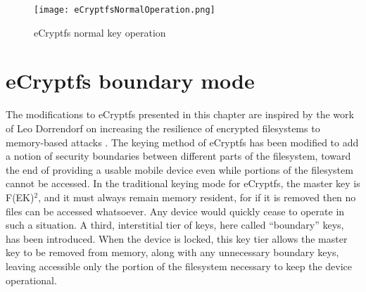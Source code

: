 \begin{figure}[htb]
\begin{center}
\texttt{[image: eCryptfsNormalOperation.png]} \end{center}
\caption{eCryptfs normal key operation} \label{fig:ecryptfsnormal} \end{figure}

\section{eCryptfs boundary mode}
\label{sec:boundarymode}
The modifications to eCryptfs presented in this chapter are inspired by the work of Leo Dorrendorf on increasing the resilience of
encrypted filesystems to memory-based attacks \cite{Dorrendorf2011}. The keying method of eCryptfs has been modified to add a
notion of security boundaries between different parts of the filesystem, toward the end of providing a usable mobile device even
while portions of the filesystem cannot be accessed. In the traditional keying mode for eCryptfs, the master key is
F(EK)$^{2}$, and it must always remain memory resident, for if it is removed then no files can be accessed whatsoever.
Any device would quickly cease to operate in such a situation. A third, interstitial tier of keys, here called ``boundary'' keys, has
been introduced. When the device is locked, this key tier allows the master key to be removed from memory, along with any unnecessary
boundary keys, leaving accessible only the portion of the filesystem necessary to keep the device operational.

